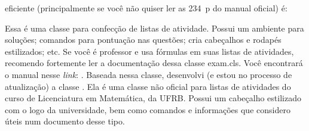 \begin{description}
                   eficiente (principalmente se você não quiser ler as 234~p do 
                   manual oficial) é: 
  \item[\textas{exam}] Essa é uma classe para confecção de listas de atividade.
                   Possui um ambiente para soluções; comandos para pontuação nas
                   questões; cria cabeçalhos e rodapés estilizados; etc.
                   Se você é professor e usa fórmulas em suas listas de 
                   atividades, recomendo fortemente ler a documentação dessa 
                   classe \textsf{exam.cls}.
                   Você encontrará o manual nesse \textit{link}:
                   .
                   \newline
                   Baseada nessa classe, desenvolvi (e estou no processo de 
                   atualização) a classe .
                   Ela é uma classe não oficial para listas de atividades do 
                   curso de Licenciatura em Matemática, da UFRB.
                   Possui um cabeçalho estilizado com o logo da universidade, bem
                   como comandos e informações que considero úteis num documento
                   desse tipo.
\end{description}



